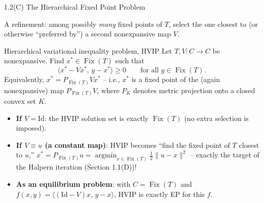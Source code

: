 \documentclass[aspectratio=169,10pt]{beamer}
\newcommand{\Fix}{\operatorname{Fix}}
\newcommand{\Id}{\mathrm{Id}}
\begin{document}
\begin{frame}{1.2(C) The Hierarchical Fixed Point Problem}

A refinement: among possibly \emph{many} fixed points of $T$, select the
one closest to (or otherwise ``preferred by'') a second nonexpansive map
$V$.

\begin{block}{Hierarchical variational inequality problem, HVIP}
Let $T,V:C\to C$ be nonexpansive. Find $x^*\in\Fix(T)$ such that
\[
  \langle x^*-V x^*,\,y-x^*\rangle \ge 0 \qquad \text{for all } y\in\Fix(T).
\]
Equivalently, $x^*=P_{\Fix(T)}Vx^*$ -- i.e., $x^*$ is a fixed point of the
(again nonexpansive) map $P_{\Fix(T)}V$, where $P_K$ denotes metric
projection onto a closed convex set $K$.
\end{block}

\begin{itemize}
  \item \textbf{If $V=\Id$}: the HVIP solution set is exactly $\Fix(T)$
    (no extra selection is imposed).
  \item \textbf{If $V\equiv u$ (a constant map)}: HVIP becomes ``find the
    fixed point of $T$ closest to $u$,''
    $x^*=P_{\Fix(T)}u=\operatorname*{argmin}_{x\in\Fix(T)}\tfrac12\|u-x\|^2$
    -- exactly the target of the Halpern iteration (Section 1.1(D))!
  \item \textbf{As an equilibrium problem}: with $C=\Fix(T)$ and
    $f(x,y)=\langle(\Id-V)x,\,y-x\rangle$, HVIP is exactly EP for this
    $f$.
\end{itemize}

\end{frame}
\end{document}
